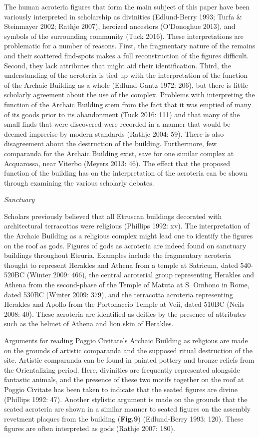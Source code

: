 The human acroteria figures that form the main subject of this paper
have been variously interpreted in scholarship as divinities
(Edlund-Berry 1993; Turfa \& Steinmayer 2002; Rathje 2007), heroized
ancestors (O'Donoghue 2013), and symbols of the surrounding community
(Tuck 2016). These interpretations are problematic for a number of
reasons. First, the fragmentary nature of the remains and their
scattered find-spots makes a full reconstruction of the figures
difficult. Second, they lack attributes that might aid their
identification. Third, the understanding of the acroteria is tied up
with the interpretation of the function of the Archaic Building as a
whole (Edlund-Gantz 1972: 206), but there is little scholarly agreement
about the use of the complex. Problems with interpreting the function of
the Archaic Building stem from the fact that it was emptied of many of
its goods prior to its abandonment (Tuck 2016: 111) and that many of the
small finds that were discovered were recorded in a manner that would be
deemed imprecise by modern standards (Rathje 2004: 59). There is also
disagreement about the destruction of the building. Furthermore, few
comparanda for the Archaic Building exist, save for one similar complex
at Acquarossa, near Viterbo (Meyers 2013: 46). The effect that the
proposed function of the building has on the interpretation of the
acroteria can be shown through examining the various scholarly debates.

\emph{Sanctuary}

Scholars previously believed that all Etruscan buildings decorated with
architectural terracottas were religious (Phillips 1992: xv). The
interpretation of the Archaic Building as a religious complex might lead
one to identify the figures on the roof as gods. Figures of gods as
acroteria are indeed found on sanctuary buildings throughout Etruria.
Examples include the fragmentary acroteria thought to represent Herakles
and Athena from a temple at Satricum, dated 540-520BC (Winter 2009:
466), the central acroterial group representing Herakles and Athena from
the second-phase of the Temple of Matuta at S. Ombono in Rome, dated
530BC (Winter 2009: 379), and the terracotta acroteria representing
Herakles and Apollo from the Portonaccio Temple at Veii, dated 510BC
(Neils 2008: 40). These acroteria are identified as deities by the
presence of attributes such as the helmet of Athena and lion skin of
Herakles.

Arguments for reading Poggio Civitate's Archaic Building as religious
are made on the grounds of artistic comparanda and the supposed ritual
destruction of the site. Artistic comparanda can be found in painted
pottery and bronze reliefs from the Orientalizing period. Here,
divinities are frequently represented alongside fantastic animals, and
the presence of these two motifs together on the roof at Poggio Civitate
has been taken to indicate that the seated figures are divine (Phillips
1992: 47). Another stylistic argument is made on the grounds that the
seated acroteria are shown in a similar manner to seated figures on the
assembly revetment plaques from the building (\textbf{Fig.9})
(Edlund-Berry 1993: 120). These figures are often interpreted as gods
(Rathje 2007: 180).

